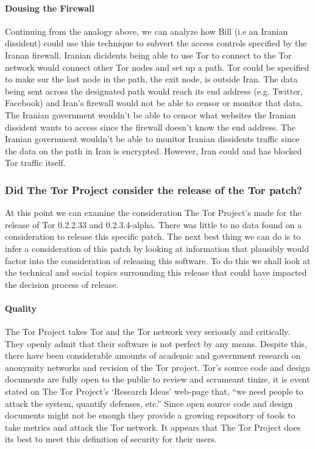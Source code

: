 \documentclass[11pt]{article}
\begin{document}
\begin{multicols}{2}
\paragraph{Dousing the Firewall}

Continuing from the analogy above, we can analyze how Bill (i.e an Iranian
dissident) could use this technique to subvert the access controls specified by
the Iranan firewall. Iranian dicidents being able to use Tor to connect to the
Tor network would connect other Tor nodes and set up a path. Tor could be
specified to make sur the last node in the path, the exit node, is outside Iran.\cite{
Tor:SpecificExitNode, Tor:FAQ} The data being sent across the designated
path would reach its end address (e.g.  Twitter, Facebook) and Iran's firewall
would not be able to censor or monitor that data. The Iranian government
wouldn't be able to censor what websites the Iranian dissident wants to access
since the firewall doesn't know the end address. The Iranian government wouldn't
be able to monitor Iranian dissidents traffic since the data on the path in Iran
is encrypted. However, Iran could and has blocked Tor traffic
itself.

\subsubsection{Did The Tor Project consider the release of the Tor patch?} 

At this point we can examine the consideration The Tor Project's made for the
release of Tor 0.2.2.33 and 0.2.3.4-alpha. There was little to no data found on
a consideration to release this specific patch. The next best thing we
can do is to infer a consideration of this patch by looking at information that
plausibly would factor into the consideration of releasing this software. To do
this we shall look at the technical and social topics surrounding this release
that could have impacted the decision process of release.

\paragraph{Quality}

The Tor Project takes Tor and the Tor network very seriously and critically.
They openly admit that their software is not perfect by any means. Despite this,
there have been considerable amounts of academic and government research on
anonymity networks and revision of the Tor project.\cite{Tor:ResearchPapers}
Tor's source code and design documents are fully open to the public to review
and scrumeant tinize, it is event stated on The Tor Project's `Research Ideas'
web-page that, ``we need people to attack the system, quantify defenses, etc.''\cite{
Tor:ResearchIdeas, Tor:2011} Since open source code and design documents
might not be enough  they provide a growing repository of tools to take metrics
and attack the Tor network.\cite{Tor:ResearchHome}
It appears that The Tor Project does its best to meet this definition of
security for their users.  


\end{multicols}
\end{document}
